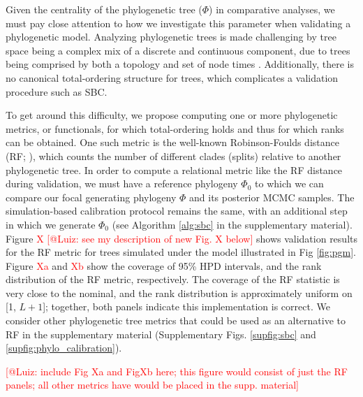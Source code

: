 \documentclass[oneside]{article}
\begin{document}
\begin{tcolorbox}[breakable, width=\textwidth, colback=gray!10, boxrule=0pt,
  title=Box 1: Validating a phylogenetic model with respect to its
  phylogenetic tree parameter, fonttitle=\bfseries]
  \small 

  Given the centrality of the phylogenetic tree ($\Phi$) in comparative
  analyses, we must pay close attention to how we investigate this
  parameter when validating a phylogenetic model.
  Analyzing phylogenetic trees is made challenging by tree space
  being a complex mix of a discrete and continuous component, due to
  trees being comprised by both a topology and set of node times
  \citep{semple03,gavryushkin16}.
  Additionally, there is no canonical total-ordering  structure for
  trees, which complicates a validation procedure such as SBC.

  \vspace{.25cm}
  To get around this difficulty, we propose computing one or more phylogenetic
  metrics, or functionals, for which total-ordering holds
  and thus for which ranks can be obtained.
   One such metric is the well-known Robinson-Foulds distance (RF; \citealp{Robinson1981}),
  which counts the number of different clades (splits)  relative to another phylogenetic tree.
  In order to compute a relational metric like the RF distance during
  validation, we must have a reference phylogeny $\Phi_0$ to which
  we can compare our focal generating phylogeny $\Phi$ and its
  posterior MCMC samples.
  The simulation-based calibration protocol remains the same, with
  an additional step in which we generate $\Phi_0$ (see Algorithm
  \ref{alg:sbc} in the supplementary material).
  Figure \textcolor{red}{X [@Luiz: see my description of new Fig. X below]} shows
  validation results for the RF metric for trees simulated under the model
  illustrated in Fig \ref{fig:pgm}. 
  Figure \textcolor{red}{Xa} and \textcolor{red}{Xb} show the coverage of 95\% HPD intervals, and the rank distribution of the RF metric, respectively.
  The coverage of the RF statistic is very close to the nominal, and the rank distribution
  is approximately uniform on [1, $L+1$]; together, both panels indicate this implementation is correct.
  We consider other phylogenetic tree metrics that could be used as an alternative
  to RF in the supplementary material (Supplementary
  Figs. \ref{supfig:sbc} and \ref{supfig:phylo_calibration}).

  \textcolor{red}{[@Luiz: include Fig Xa and FigXb here; this figure
    would consist of just the RF panels; all other metrics have would
    be placed in the supp. material]}
    
\end{tcolorbox}
\end{document}
